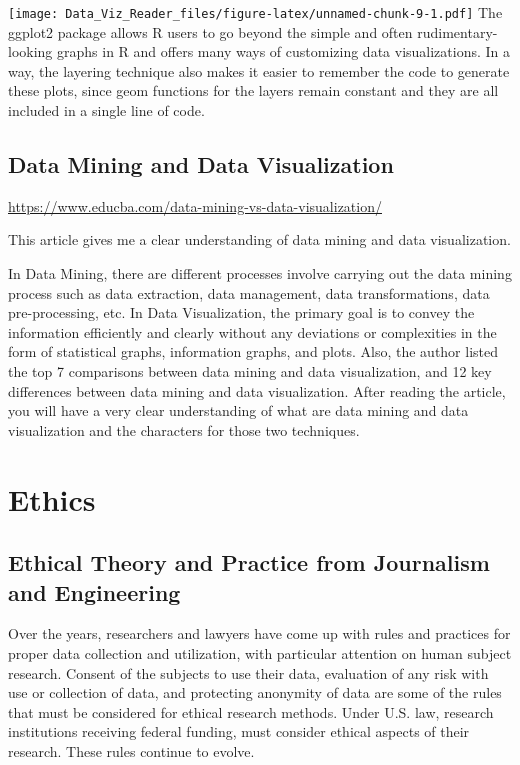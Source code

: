 \documentclass[]{book}
\theoremstyle{definition}
\theoremstyle{definition}
\theoremstyle{definition}
\theoremstyle{remark}
\begin{document}
\texttt{[image: Data\_Viz\_Reader\_files/figure-latex/unnamed-chunk-9-1.pdf]}
The ggplot2 package allows R users to go beyond the simple and often
rudimentary-looking graphs in R and offers many ways of customizing data
visualizations. In a way, the layering technique also makes it easier to
remember the code to generate these plots, since geom functions for the
layers remain constant and they are all included in a single line of
code.

\section{Data Mining and Data
Visualization}\label{data-mining-and-data-visualization}

\url{https://www.educba.com/data-mining-vs-data-visualization/}

This article gives me a clear understanding of data mining and data
visualization.

In Data Mining, there are different processes involve carrying out the
data mining process such as data extraction, data management, data
transformations, data pre-processing, etc. In Data Visualization, the
primary goal is to convey the information efficiently and clearly
without any deviations or complexities in the form of statistical
graphs, information graphs, and plots. Also, the author listed the top 7
comparisons between data mining and data visualization, and 12 key
differences between data mining and data visualization. After reading
the article, you will have a very clear understanding of what are data
mining and data visualization and the characters for those two
techniques.

\chapter{Ethics}\label{ethics}

\section{Ethical Theory and Practice from Journalism and
Engineering}\label{ethical-theory-and-practice-from-journalism-and-engineering}

\citep{poli_social_science} Over the years, researchers and lawyers have
come up with rules and practices for proper data collection and
utilization, with particular attention on human subject research.
Consent of the subjects to use their data, evaluation of any risk with
use or collection of data, and protecting anonymity of data are some of
the rules that must be considered for ethical research methods. Under
U.S. law, research institutions receiving federal funding, must consider
ethical aspects of their research. These rules continue to evolve.
\end{document}
